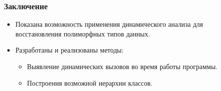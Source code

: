 \documentclass{beamer}
\begin{document}
\begin{frame}
\frametitle{Заключение}
\begin{Large}
\begin{itemize}
\item Показана возможность применения динамического анализа для восстановления полиморфных типов данных.
\item Разработаны и реализованы методы:
\begin{itemize}
    \item Выявление динамических вызовов во время работы программы.
    \item Построения возможной иерархии классов.
\end{itemize}
\end{itemize}
\end{Large}
\end{frame}
\end{document}
